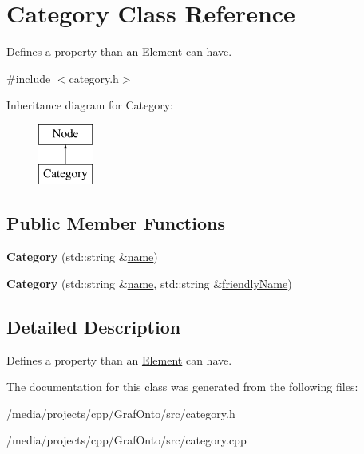\hypertarget{class_category}{\section{\-Category \-Class \-Reference}
\label{class_category}
}


\-Defines a property than an \hyperlink{class_element}{\-Element} can have.  




{\ttfamily \#include $<$category.\-h$>$}

\-Inheritance diagram for \-Category\-:\begin{figure}[H]
\begin{center}
\leavevmode
\includegraphics[height=2.000000cm]{class_category}
\end{center}
\end{figure}
\subsection*{\-Public \-Member \-Functions}
\begin{DoxyCompactItemize}
\item 
\hypertarget{class_category_ab74a10923bdce33e410037583935417e}{{\bfseries \-Category} (std\-::string \&\hyperlink{class_node_aa829edc37a2c92dacdab95bcef248175}{name})}\label{class_category_ab74a10923bdce33e410037583935417e}

\item 
\hypertarget{class_category_a2a2510620a2b2b5af786ea6fe3185860}{{\bfseries \-Category} (std\-::string \&\hyperlink{class_node_aa829edc37a2c92dacdab95bcef248175}{name}, std\-::string \&\hyperlink{class_node_a157acddebd6860eccdc8495039db161f}{friendly\-Name})}\label{class_category_a2a2510620a2b2b5af786ea6fe3185860}

\end{DoxyCompactItemize}


\subsection{\-Detailed \-Description}
\-Defines a property than an \hyperlink{class_element}{\-Element} can have. 

\-The documentation for this class was generated from the following files\-:\begin{DoxyCompactItemize}
\item 
/media/projects/cpp/\-Graf\-Onto/src/category.\-h\item 
/media/projects/cpp/\-Graf\-Onto/src/category.\-cpp\end{DoxyCompactItemize}
